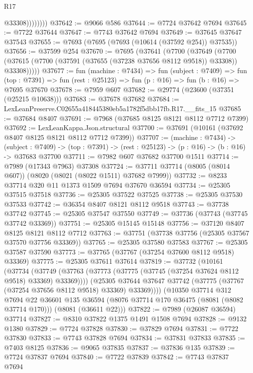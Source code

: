 \begin{lexlean}{R17}
\begin{coremodule}
                    @33308))))))))
@37642 := @9066 @586
@37644 := @7724 @37642 @7694
@37645 := @7722 @37644
@37647 := @7743 @37642 @7694
@37649 := @37645 @37647 @37543
@37655 := @7693 (@7695 (@7693 (@10614 (@37592 @254)) @37535))
@37656 := @37599 @254
@37670 := @7695
    (@37641
      (@7700
        (@37649
          (@7700 (@37615 (@7700 (@37591 (@37655 (@37238 @37656 @8112 @9518)) @33308)) @33308)))))
@37677 := fun (machine : @7434) =>
  fun (subject : @7409) =>
  fun (top : @7391) => fun (rest : @25123) => fun (p : @16) => fun (b : @16) => @7695 @37670
@37678 := @7959 @607
@37682 := @29774 (@23600 (@37351 (@25215 @10638)))
@37683 := @37678 @37682
@37684 := LexLeanPreserve.C02655a418445380eb5a1782f5dbb17fb.R17.__fits_15
@37685 := @37684 @8407
@37691 := @7968 (@37685 @8125 @8121 @8112 @7712 @7399)
@37692 := LexLeanKappa.Json.structural
@37700 := @37691 (@10161 (@37692 @8407 @8125 @8121 @8112 @7712 @7399))
@37707 := (machine : @7434) ->
  (subject : @7409) -> (top : @7391) -> (rest : @25123) -> (p : @16) -> (b : @16) -> @37683 @37700
@37711 := @7982 @607 @37682 @37700 @1511
@37714 := @7989 (@17343 @7963) @37308
@37724 := @37711 @37714 (@8005 (@8014 @607)) (@8020 (@8021 (@8022 @1511) @37682 @7999))
@37732 := @8233 @37714 @320 @11 @1373 @1509 @7694 @37670 @36594
@37734 := @25305 @37515 @37518
@37736 := @25305 @37522 @37525
@37738 := @25305 @37530 @37533
@37742 := @36354 @8407 @8121 @8112 @9518
@37743 := @37738 @37742
@37745 := @25305 @37547 @37550
@37749 := @37736 (@37743 (@37745 @37742 @33369))
@37751 := @25305 @15145 @15148
@37756 := @37120 @8407 @8125 @8121 @8112 @7712
@37763 := @37751 (@37738 @37756 (@25305 @37567 @37570 @37756 @33369))
@37765 := @25305 @37580 @37583
@37767 := @25305 @37587 @37590
@37773 := @37765 (@37767 (@37254 @37600 @8112 @9518) @33369)
@37775 := @25305 @37611 @37614
@37819 := @37732
    (@10161
      (@37734
        (@37749 (@37763 (@37773 (@37775 (@37745 (@37254 @37624 @8112 @9518) @33369) @33369))))
        (@25305 @37644 @37647 @37742 (@37775 (@37767 (@37254 @37656 @8112 @9518) @33369) @33369))))
    (@10350
      @37714
      @312
      @7694
      @22
      @36601
      @135
      @36594
      (@8076 @37714 @170 @36475 (@8081 (@8082 @37714 @170)))
      (@8081 (@36611 @22)))
@37822 := @7989 (@26087 @36594) @37714
@37827 := @8310 @37822 @1375 @1491 @1508 @7694
@37828 := @9132 @1380
@37829 := @7724 @37828
@37830 := @37829 @7694
@37831 := @7722 @37830
@37833 := @7743 @37828 @7694
@37834 := @37831 @37833
@37835 := @7403 @8125
@37836 := @9065 @37835
@37837 := @37836 @135
@37839 := @7724 @37837 @7694
@37840 := @7722 @37839
@37842 := @7743 @37837 @7694

\end{coremodule}
\end{lexlean}
